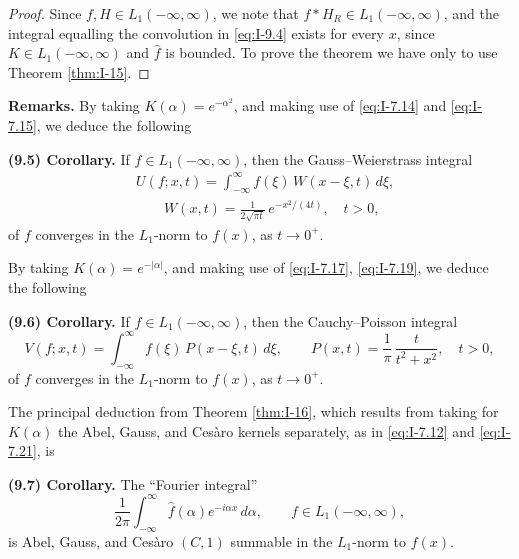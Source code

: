 \begin{proof}
Since $f,H\in L_1(-\infty,\infty)$, we note that $f*H_R\in L_1(-\infty,\infty)$, and the integral equalling the convolution in \eqref{eq:I-9.4} exists for every $x$, since $K\in L_1(-\infty,\infty)$ and $\widehat f$ is bounded. To prove the theorem we have only to use Theorem \ref{thm:I-15}.
\end{proof}

\noindent\textbf{Remarks.}
By taking $K(\alpha)=e^{-\alpha^{2}}$, and making use of \eqref{eq:I-7.14} and \eqref{eq:I-7.15}, we deduce the following

\noindent\textbf{(9.5) Corollary.}
If $f\in L_1(-\infty,\infty)$, then the Gauss--Weierstrass integral
\begin{equation}\tag{9.5}\label{eq:I-9.5}
\begin{aligned}
&U(f;x,t) = \int_{-\infty}^{\infty}f(\xi)\,W(x-\xi,t)\,d\xi,\\
&\qquad W(x,t) = \frac{1}{2\sqrt{\pi t}}\,e^{-x^{2}/(4t)},\quad t > 0,
\end{aligned}
\end{equation}
of $f$ converges in the $L_1$-norm to $f(x)$, as $t\to 0^+$.

By taking $K(\alpha)=e^{-|\alpha|}$, and making use of \eqref{eq:I-7.17}, \eqref{eq:I-7.19}, we deduce the following

\noindent\textbf{(9.6) Corollary.}
If $f\in L_1(-\infty,\infty)$, then the Cauchy--Poisson integral
\begin{equation}\tag{9.6}\label{eq:I-9.6}
V(f;x,t)=\int_{-\infty}^{\infty}f(\xi)\,P(x-\xi,t)\,d\xi,\qquad
P(x,t)=\frac{1}{\pi}\,\frac{t}{t^{2}+x^{2}},\quad t>0,
\end{equation}
of $f$ converges in the $L_1$-norm to $f(x)$, as $t\to 0^+$.

The principal deduction from Theorem \ref{thm:I-16}, which results from taking for $K(\alpha)$ the Abel, Gauss, and Ces\`aro kernels separately, as in \eqref{eq:I-7.12} and \eqref{eq:I-7.21}, is

\noindent\textbf{(9.7) Corollary.}
The ``Fourier integral''
\begin{equation*}
\frac{1}{2\pi}\int_{-\infty}^{\infty}\widehat f(\alpha)e^{-i\alpha x}\,d\alpha,\qquad f\in L_1(-\infty,\infty),
\end{equation*}
is Abel, Gauss, and Ces\`aro $(C,1)$ summable in the $L_1$-norm to $f(x)$.

